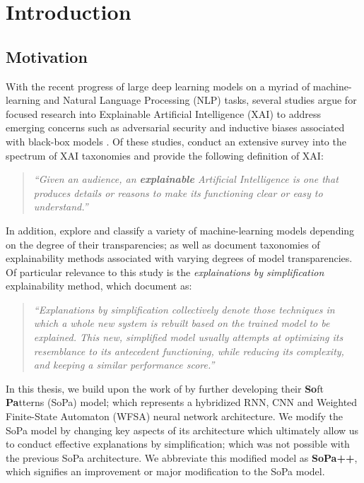 \chapter{Introduction}

\label{introduction}

\section{Motivation}

With the recent progress of large deep learning models on a myriad of machine-learning and Natural Language Processing (NLP) tasks, several studies argue for focused research into Explainable Artificial Intelligence (XAI) to address emerging concerns such as adversarial security and inductive biases associated with black-box models \citep{doran2017does,townsend2019extracting,danilevsky2020survey,arrieta2020explainable}. Of these studies, \citet{arrieta2020explainable} conduct an extensive survey into the spectrum of XAI taxonomies and provide the following definition of XAI:

\begin{quote}
  \textit{``Given an audience, an \textbf{explainable} Artificial Intelligence is one that produces details or reasons to make its functioning clear or easy to understand.''}
\end{quote}

In addition, \citet{arrieta2020explainable} explore and classify a variety of machine-learning models depending on the degree of their transparencies; as well as document taxonomies of explainability methods associated with varying degrees of model transparencies. Of particular relevance to this study is the \textit{explainations by simplification} explainability method, which \citet{arrieta2020explainable} document as:

\begin{quote}
\textit{``Explanations by simplification collectively denote those techniques in which a whole new system is rebuilt based on the trained model to be explained. This new, simplified model usually attempts at optimizing its resemblance to its antecedent functioning, while reducing its complexity, and keeping a similar performance score.''} 
\end{quote}

In this thesis, we build upon the work of \citet{schwartz2018sopa} by further developing their \textbf{So}ft \textbf{Pa}tterns (SoPa) model; which represents a hybridized RNN, CNN and Weighted Finite-State Automaton (WFSA) neural network architecture. We modify the SoPa model by changing key aspects of its architecture which ultimately allow us to conduct effective explanations by simplification; which was not possible with the previous SoPa architecture. We abbreviate this modified model as \textbf{SoPa++}, which signifies an improvement or major modification to the SoPa model.

